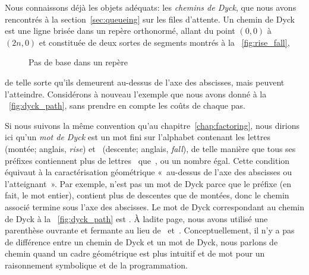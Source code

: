 Nous connaissons déjà les objets adéquats: les \emph{chemins de
  Dyck}, que nous avons rencontrés à la
section~\ref{sec:queueing} sur les files d'attente. Un
chemin de Dyck est une ligne brisée dans un repère orthonormé, allant
du point \((0,0)\) à \((2n,0)\) et constituée de deux sortes de
segments montrés à la \fig~\vref{fig:rise_fall},
\begin{figure}[b]
\centering
{}
\qquad
{}
\caption{Pas de base dans un repère\label{fig:rise_fall}}
\end{figure}
de telle sorte qu'ils demeurent au-dessus de l'axe des abscisses, mais
peuvent l'atteindre. Considérons à nouveau l'exemple que nous avons
donné à la \fig~\vref{fig:dyck_path}, sans prendre en compte les coûts
de chaque pas.

Si nous suivons la même convention qu'au
chapitre~\ref{chap:factoring}, nous dirions ici qu'un \emph{mot de
  Dyck} est un mot fini sur
l'alphabet contenant les lettres~ (montée; anglais,
\emph{rise}) et~ (descente;
anglais, \emph{fall}), de telle manière
que tous ses préfixes contiennent
plus de lettres~ que~, ou un nombre égal. Cette
condition équivaut à la caractérisation géométrique «~au-dessus de
l'axe des abscisses ou l'atteignant~». Par exemple,  n'est pas
un mot de Dyck parce que le préfixe  (en fait, le mot
entier), contient plus de descentes que de montées, donc le chemin
associé termine sous l'axe des abscisses. Le mot de Dyck correspondant
au chemin de Dyck à la \fig~\vref{fig:dyck_path} est
. À ladite page, nous avons utilisé une parenthèse
ouvrante et fermante au lieu de~
et~. Conceptuellement, il n'y a pas de différence entre un
chemin de Dyck et un mot de Dyck, nous parlons de chemin quand un
cadre géométrique est plus intuitif et de mot pour un raisonnement
symbolique et de la programmation.

